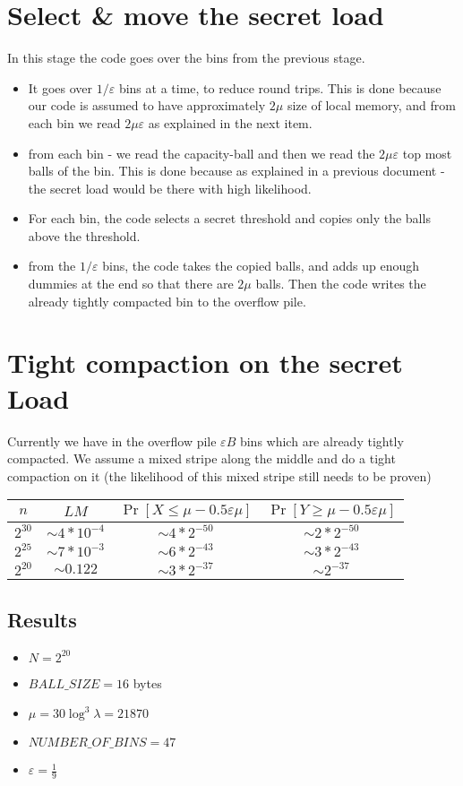 \documentclass{article}
\begin{document}
\section{Select \& move the secret load}
In this stage the code goes over the bins from the previous stage.
\begin{itemize}
    \item It goes over $1/\varepsilon$ bins at a time, to reduce round trips. This is done because our code is assumed to have approximately $2\mu$ size of local memory, and from each bin we read $2\mu\varepsilon$ as explained in the next item.
    \item from each bin - we read the capacity-ball and then we read the $2\mu\varepsilon$ top most balls of the bin. This is done because as explained in a previous document - the secret load would be there with high likelihood.
    \item For each bin, the code selects a secret threshold and copies only the balls above the threshold.
    \item from the $1/\varepsilon$ bins, the code takes the copied balls, and adds up enough dummies at the end so that there are $2\mu$ balls. Then the code writes the already tightly compacted bin to the overflow pile.
\end{itemize}
\section{Tight compaction on the secret Load}
Currently we have in the overflow pile $\varepsilon B$ bins which are already tightly compacted. We assume a mixed stripe along the middle and do a tight compaction on it (the likelihood of this mixed stripe still needs to be proven)


\begin{center}
\begin{tabular}{||c c c c||} 
 \hline
 $n$ & $LM$ & $\Pr[X\leq \mu - 0.5\varepsilon\mu]$ & $\Pr[Y\geq \mu - 0.5\varepsilon\mu]$ \\ [0.5ex] 
 \hline\hline
 $2^{30}$ & $\sim4*10^{-4}$ & $\sim4*2^{-50}$ & $\sim2*2^{-50}$\\ 
 \hline
 $2^{25}$ & $\sim7*10^{-3}$ & $\sim6*2^{-43}$ & $\sim3*2^{-43}$\\ 
 \hline
  $2^{20}$ & $\sim0.122$ & $\sim3*2^{-37}$ & $\sim2^{-37}$\\ 
 \hline
\end{tabular}
\end{center}
\subsection{Results}
\begin{itemize}
    \item $N = 2^{20}$ 
    \item $BALL\_SIZE = 16$ bytes
    \item $\mu = 30\log^3{\lambda} = 21870$
    \item $NUMBER\_OF\_BINS = 47$
    \item $\varepsilon = \frac{1}{9}$
\end{itemize}
\end{document}
